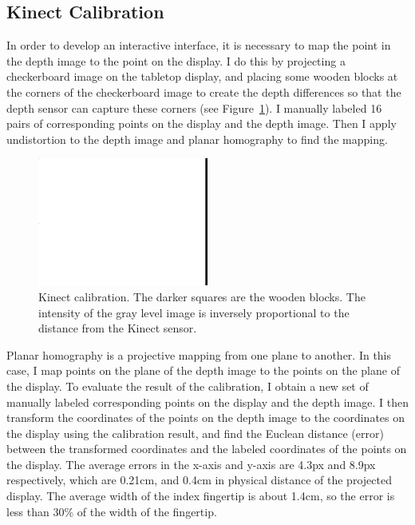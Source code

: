 \subsection{Kinect Calibration}
In order to develop an interactive interface, it is necessary to map the point
in the depth image to the point on the display. I do this by projecting a
checkerboard image on the tabletop display, and placing some wooden blocks at
the corners of the checkerboard image to create the depth differences so that 
the depth sensor can capture these corners (see Figure~\ref{fig:calibration}).
I manually labeled 16 pairs of corresponding points on the display and the depth
image. Then I apply undistortion to the depth image and planar homography to find the mapping.

\begin{figure}[tbh]
  \centering
  \includegraphics[width=0.5\textwidth]{figures/calibration.png} 
  \caption{Kinect calibration. The darker squares are the wooden blocks. The
  intensity of the gray level image is inversely proportional to the distance
  from the Kinect sensor.}
  \label{fig:calibration}
\end{figure}

Planar homography is a projective mapping from one plane to another. In this
case, I map points on the plane of the depth image to the points
on the plane of the display. To evaluate the result of the calibration, I
obtain a new set of manually labeled corresponding points on the display and the
depth image. I then transform the coordinates of the points on the depth image
to the coordinates on the display using the calibration result, and find the
Euclean distance (error) between the transformed coordinates and the labeled
coordinates of the points on the display. The average errors in the x-axis and
y-axis are 4.3px and 8.9px respectively, which are 0.21cm, and 0.4cm in physical distance of the
projected display. The average width of the index fingertip is about 1.4cm, so
the error is less than 30\% of the width of the fingertip. 

